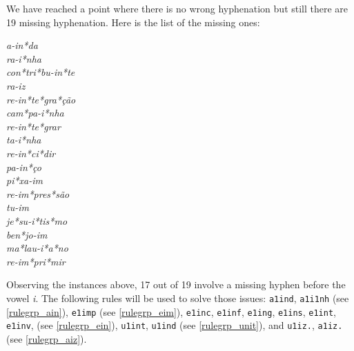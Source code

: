 We have reached a point where there is no wrong hyphenation but still there are 19 missing hyphenation. Here is the list of the missing ones:
\begin{multicols}{5}
\setlength{\columnsep}{0pt}
\setlength{\parindent}{0pt}
\emph{a-in*da \\ ra-i*nha \\ con*tri*bu-in*te \\ ra-iz \\ re-in*te*gra*ção \\ cam*pa-i*nha \\ re-in*te*grar \\ ta-i*nha \\ re-in*ci*dir \\ pa-in*ço \\ pi*xa-im \\ re-im*pres*são \\ tu-im \\ je*su-i*tis*mo \\ ben*jo-im \\ ma*lau-i*a*no \\ re-im*pri*mir}
\end{multicols}
\noindent{}Observing the instances above, 17 out of 19 involve a missing hyphen before the vowel \emph{i}. The following rules
will be used to solve those issues: \texttt{a1ind}, \texttt{a1i1nh} (see \cref{rulegrp_ain}), \texttt{e1imp} (see \cref{rulegrp_eim}), 
\texttt{e1inc}, \texttt{e1inf}, \texttt{e1ing}, \texttt{e1ins}, \texttt{e1int}, \texttt{e1inv}, (see \cref{rulegrp_ein}), 
\texttt{u1int}, \texttt{u1ind} (see \cref{rulegrp_unit}), and \texttt{u1iz.}, \texttt{a1iz.} (see \cref{rulegrp_aiz}).


